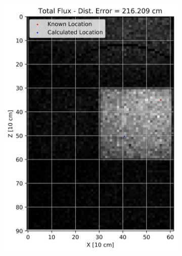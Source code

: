 \begin{figure}[!htb]
\begin{subfigure}[b]{0.15\textwidth}
   \centering
   \includegraphics[width=1\linewidth]{images/2Cent_Total_2fl_Wall_N}
   \caption{}
   \label{fig:RanT2WN}
\end{subfigure}
\begin{subfigure}[b]{0.15\textwidth}
   \centering

\end{subfigure}
\end{figure}
